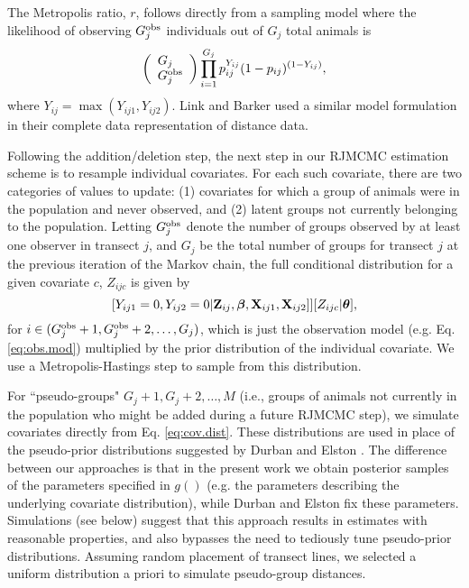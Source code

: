 \documentclass[10pt]{article}
\begin{document}
The Metropolis ratio, $r$, follows directly from a sampling model where the likelihood of observing $G_j^{\rm obs}$ individuals out of $G_j$ total animals is
$$
\left( \begin{array}{l}
G_j \\
G_j^{\rm obs}
\end{array} \right)
\prod_{i=1}^{G_j} p_{ij}^{Y_{ij}} (1-p_{ij})^{(1-Y_{ij})},
$$
where $Y_{ij}=\max(Y_{ij1},Y_{ij2})$.  Link and Barker \cite{LinkBarker2010} used a similar model formulation in their complete data representation of distance data.

Following the addition/deletion step, the next step in our RJMCMC estimation scheme is to resample individual covariates.  For each such covariate, there are two categories of values to update: (1) covariates for which a group of animals were in the population and never observed, and (2) latent groups not currently belonging to the population. Letting $G_j^{\rm obs}$ denote the number of groups observed by at least one observer in transect $j$, and $G_j$ be the total number of groups for transect $j$ at the previous iteration of the Markov chain, the full conditional distribution for a given covariate $c$, $Z_{ijc}$ is given by
$$
[Y_{ij1}=0,Y_{ij2}=0|{\bf Z}_{ij},\boldsymbol{\beta},{\bf X}_{ij1},{\bf X}_{ij2}]][Z_{ijc}|\boldsymbol{\theta}],
$$
for $i \in (G_j^{\rm obs}+1,G_{j}^{\rm obs}+2,\hdots,G_j)$,
which is just the observation model (e.g. Eq. \ref{eq:obs.mod}) multiplied by the prior distribution of the individual covariate.  We use a Metropolis-Hastings step to sample from this distribution.

For ``pseudo-groups" $G_j+1,G_j+2, \hdots,M$ (i.e., groups of animals not currently in the population who might be added during a future RJMCMC step), we simulate covariates directly from Eq. \ref{eq:cov.dist}.  These distributions are used in place of the pseudo-prior distributions suggested by Durban and Elston \cite{DurbanElston2005}.  The difference between our approaches is that in the present work we obtain posterior samples of the parameters specified in  $g()$ (e.g. the parameters describing the underlying covariate distribution), while Durban and Elston fix these parameters.  Simulations (see below) suggest that this approach results in estimates with reasonable properties, and also bypasses the need to tediously tune pseudo-prior distributions.  Assuming random placement of transect lines, we selected a uniform distribution a priori to simulate pseudo-group distances.
\end{document}
